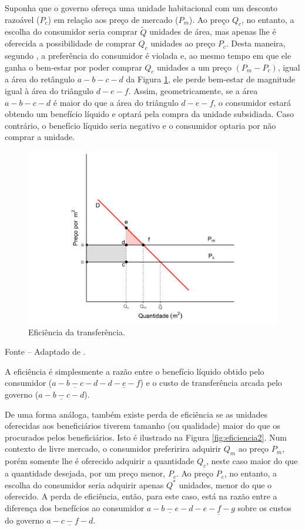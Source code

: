 \documentclass[
	12pt,				%
	oneside,			%
	a4paper,			%
	chapter=TITLE,		%
	section=TITLE,		%
	english,			%
	brazil				%
	]{abntex2}
\newcommand{\bcenter}{\begin{center}}
\newcommand{\ecenter}{\end{center}}
\begin{document}
\begin{refsection}
Suponha que o governo ofereça uma unidade habitacional com um desconto razoável
(\(P_c\)) em relação aos preço de mercado (\(P_m\)). Ao preço \(Q_c\), no entanto, a
escolha do consumidor seria comprar \(\tilde{Q}\) unidades de área, mas apenas lhe
é oferecida a possibilidade de comprar \(Q_c\) unidades ao preço \(P_c\). Desta
maneira, segundo \textcite{malpezzi_affordable_2018_1}, a preferência do consumidor é
violada e, ao mesmo tempo em que ele ganha o bem-estar por poder comprar \(Q_c\)
unidades a um preço \((P_m-P_c)\), igual a área do retângulo \(a-b-c-d\) da Figura
\ref{fig:eficiencia}, ele perde bem-estar de magnitude igual à área do
triângulo \(d-e-f\). Assim, geometricamente, se a área \(a-b-c-d\) é maior do que a
área do triângulo \(d-e-f\), o consumidor estará obtendo um benefício líquido e
optará pela compra da unidade subsidiada. Caso contrário, o benefício líquido
seria negativo e o consumidor optaria por não comprar a unidade.
\begin{figure}[H]

{\centering \includegraphics[width=0.7\linewidth]{images/eficiencia-1} 

}

\caption{Eficiência da transferência.}\label{fig:eficiencia}
\end{figure}
\bcenter

\small Fonte -- Adaptado de \textcite{malpezzi_affordable_2018_1}.
\ecenter

A eficiência é simplesmente a razão entre o benefício líquido obtido pelo
consumidor (\(\underline{a-b-c-d} - \underline{d-e-f}\)) e o custo de transferência
arcada pelo governo (\(\underline{a-b-c-d}\)).

De uma forma análoga, também existe perda de eficiência se as unidades
oferecidas aos beneficiários tiverem tamanho (ou qualidade) maior do que os
procurados pelos beneficiários. Isto é ilustrado na Figura \ref{fig:eficiencia2}.
Num contexto de livre mercado, o consumidor preferirira adquirir \(Q_m\) ao preço
\(P_m\), porém somente lhe é oferecido adquirir a quantidade \(Q_c\), neste caso
maior do que a quantidade desejada, por um preço menor, \(P_c\). Ao preço \(P_c\),
no entanto, a escolha do consumidor seria adquirir apenas \(Q^*\) unidades, menor
do que o oferecido. A perda de eficiência, então, para este caso, está na razão
entre a diferença dos benefícios ao consumidor
\(\underline{a-b-e-d}-\underline{e-f-g}\) sobre os custos do governo
\(\underline{a-c-f-d}\).
\begin{figure}[H]


\end{figure}
\end{refsection}
\end{document}
